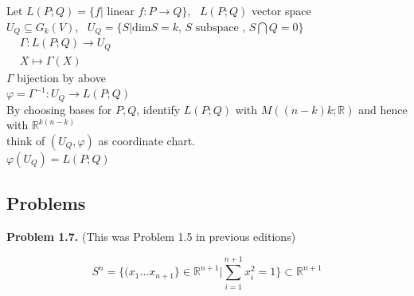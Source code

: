 \documentclass[11pt]{amsart}
\theoremstyle{definition}
\newcommand{\problemhead}[1]{\medskip\noindent\textbf{Problem #1.} }
\begin{document}
Let $L(P;Q) = \lbrace f | \text{ linear } f : P \to Q \rbrace$, \, $L(P;Q)$ vector space \\
$U_Q \subseteq G_k(V)$, \, $U_Q = \lbrace S | \text{dim}S =k, \, S \text{ subspace }, \, S \bigcap Q = 0 \rbrace$ \\
$\begin{aligned}
  & \Gamma : L(P;Q) \to U_Q \\
  & X \mapsto \Gamma(X) \end{aligned}$ \\

$\Gamma$ bijection by above \\
$\varphi = \Gamma^{-1} : U_Q \to L(P;Q)$  \\

By choosing bases for $P,Q$, identify $L(P;Q)$ with $M((n-k)k; \mathbb{R})$ and hence with $\mathbb{R}^{k(n-k)}$ \\

think of $(U_Q, \varphi)$ as coordinate chart. \\
$\varphi(U_Q) = L(P;Q)$













\subsection*{Problems}

\problemhead{1.7} (This was Problem 1.5 in previous editions)

\[
S^n = \lbrace ( x_1 \dots x_{n+1} \rbrace \in \mathbb{R}^{n+1} | \sum_{i=1}^{n+1} x_i^2 = 1 \rbrace \subset \mathbb{R}^{n+1}
\]
\end{document}
